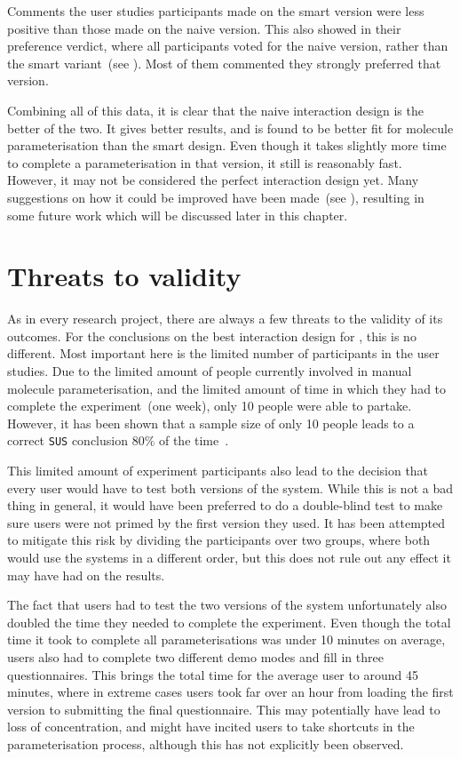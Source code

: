 Comments the user studies participants made on the smart version were less positive than those made on the naive version. This also showed in their preference verdict, where all participants voted for the naive version, rather than the smart variant~(see ). Most of them commented they strongly preferred that version.

Combining all of this data, it is clear that the naive interaction design is the better of the two. It gives better results, and is found to be better fit for molecule parameterisation than the smart design. Even though it takes slightly more time to complete a parameterisation in that version, it still is reasonably fast. However, it may not be considered the perfect interaction design yet. Many suggestions on how it could be improved have been made~(see ), resulting in some future work which will be discussed later in this chapter.


\section{Threats to validity}
As in every research project, there are always a few threats to the validity of its outcomes. For the conclusions on the best interaction design for \oframp, this is no different. Most important here is the limited number of participants in the user studies. Due to the limited amount of people currently involved in manual molecule parameterisation, and the limited amount of time in which they had to complete the experiment~(one week), only 10 people were able to partake. However, it has been shown that a sample size of only 10 people leads to a correct \verb|SUS| conclusion $80\%$ of the time~\cite{tullis2004comparison}.

This limited amount of experiment participants also lead to the decision that every user would have to test both versions of the system. While this is not a bad thing in general, it would have been preferred to do a double-blind test to make sure users were not primed by the first version they used. It has been attempted to mitigate this risk by dividing the participants over two groups, where both would use the systems in a different order, but this does not rule out any effect it may have had on the results.

The fact that users had to test the two versions of the system unfortunately also doubled the time they needed to complete the experiment. Even though the total time it took to complete all parameterisations was under 10 minutes on average, users also had to complete two different demo modes and fill in three questionnaires. This brings the total time for the average user to around 45 minutes, where in extreme cases users took far over an hour from loading the first version to submitting the final questionnaire. This may potentially have lead to loss of concentration, and might have incited users to take shortcuts in the parameterisation process, although this has not explicitly been observed.

